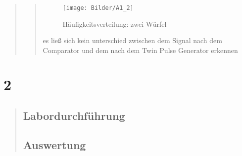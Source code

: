 \begin{quote}
\begin{quote}
            \begin{minipage}{0.6\textwidth}
                \begin{figure}[H]
                    \label{fig:pico_funktion0alpha}
                    \texttt{[image: Bilder/A1\_2]}
                    \caption{Häufigkeitsverteilung: zwei Würfel}
                \end{figure}
        
            \end{minipage}
        
        es ließ sich kein unterschied zwischen dem Signal nach dem Comparator und dem nach dem Twin Pulse Generator erkennen
    \end{quote}
    
\end{quote}


\section{2}
\begin{quote}
    
    
    \subsection{Labordurchführung}
    \begin{quote}
        
        
    \end{quote}
    
    
    
    
    
    \subsection{Auswertung}
    \begin{quote}
        
    \end{quote}
    
\end{quote}



%     
%         

